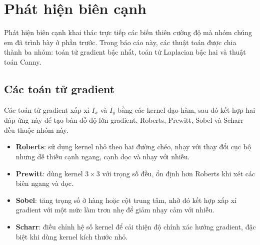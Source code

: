 \documentclass[12pt]{article}
\numberwithin{equation}{section}
\begin{document}
\section{Phát hiện biên cạnh}

Phát hiện biên cạnh khai thác trực tiếp các biến thiên cường độ mà nhóm chúng em đã trình bày ở phần trước. Trong báo cáo này, các thuật toán được chia thành ba nhóm: toán tử gradient bậc nhất, toán tử Laplacian bậc hai và thuật toán Canny.

\subsection{Các toán tử gradient}

Các toán tử gradient xấp xỉ $I_x$ và $I_y$ bằng các kernel đạo hàm, sau đó kết hợp hai đáp ứng này để tạo bản đồ độ lớn gradient. Roberts, Prewitt, Sobel và Scharr đều thuộc nhóm này.

\begin{itemize}
  \item \textbf{Roberts}: sử dụng kernel nhỏ theo hai đường chéo, nhạy với thay đổi cục bộ nhưng dễ thiếu cạnh ngang, cạnh dọc và nhạy với nhiễu.
  \item \textbf{Prewitt}: dùng kernel $3\times3$ với trọng số đều, ổn định hơn Roberts khi xét các biên ngang và dọc.
  \item \textbf{Sobel}: tăng trọng số ở hàng hoặc cột trung tâm, nhờ đó kết hợp xấp xỉ gradient với một mức làm trơn nhẹ để giảm nhạy cảm với nhiễu.
  \item \textbf{Scharr}: điều chỉnh hệ số kernel để cải thiện độ chính xác hướng gradient, đặc biệt khi dùng kernel kích thước nhỏ.
\end{itemize}
\end{document}
